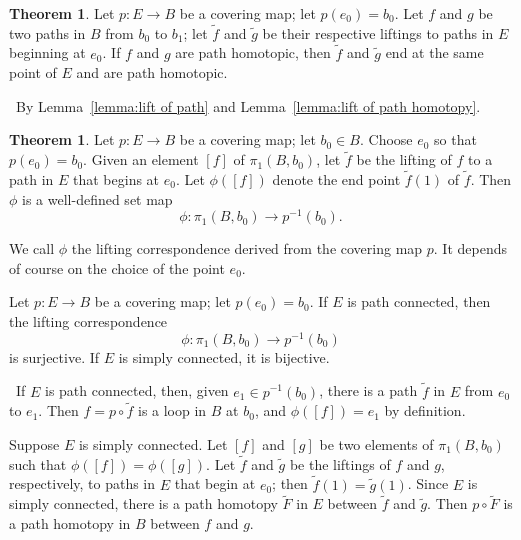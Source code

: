 \documentclass[12pt,a4paper]{book}
\newenvironment{prooff}{{\noindent\it\textcolor{cyan!40!black}{Proof}:}\,}{\par}
\theoremstyle{definition}
\newtheorem{theo}[defn]{Theorem}
\begin{document}
\begin{theo}
    Let $p: E \rightarrow B$ be a covering map; let $p\left(e_0\right)=b_0$. Let $f$ and $g$ be two paths in $B$ from $b_0$ to $b_1$; let $\tilde{f}$ and $\tilde{g}$ be their respective liftings to paths in $E$ beginning at $e_0$. If $f$ and $g$ are path homotopic, then $\tilde{f}$ and $\tilde{g}$ end at the same point of $E$ and are path homotopic.
\end{theo}
\begin{prooff}
    By Lemma~\ref{lemma:lift of path} and Lemma~\ref{lemma:lift of path homotopy}.
\end{prooff}

\begin{theo}
    Let $p: E \rightarrow B$ be a covering map; let $b_0 \in B$. Choose $e_0$ so that $p\left(e_0\right)=b_0$. Given an element $[f]$ of $\pi_1\left(B, b_0\right)$, let $\tilde{f}$ be the lifting of $f$ to a path in $E$ that begins at $e_0$. Let $\phi([f])$ denote the end point $\tilde{f}(1)$ of $\tilde{f}$. Then $\phi$ is a well-defined set map
    $$
        \phi: \pi_1\left(B, b_0\right) \rightarrow p^{-1}\left(b_0\right) .
    $$

    We call $\phi$ the lifting correspondence derived from the covering map $p$. It depends of course on the choice of the point $e_0$.

    Let $p: E \rightarrow B$ be a covering map; let $p\left(e_0\right)=b_0$. If $E$ is path connected, then the lifting correspondence
    $$
        \phi: \pi_1\left(B, b_0\right) \rightarrow p^{-1}\left(b_0\right)
    $$
    is surjective. If $E$ is simply connected, it is bijective.
    \label{tehorem:lifting correspondence}
\end{theo}
\begin{prooff}
    If $E$ is path connected, then, given $e_1 \in p^{-1}\left(b_0\right)$, there is a path $\tilde{f}$ in $E$ from $e_0$ to $e_1$. Then $f=p \circ \tilde{f}$ is a loop in $B$ at $b_0$, and $\phi([f])=e_1$ by definition.

    Suppose $E$ is simply connected. Let $[f]$ and $[g]$ be two elements of $\pi_1\left(B, b_0\right)$ such that $\phi([f])=\phi([g])$. Let $\tilde{f}$ and $\tilde{g}$ be the liftings of $f$ and $g$, respectively, to paths in $E$ that begin at $e_0$; then $\tilde{f}(1)=\tilde{g}(1)$. Since $E$ is simply connected, there is a path homotopy $\tilde{F}$ in $E$ between $\tilde{f}$ and $\tilde{g}$. Then $p \circ \tilde{F}$ is a path homotopy in $B$ between $f$ and $g$.
\end{prooff}
\end{document}

